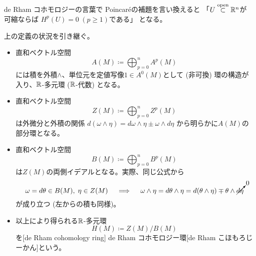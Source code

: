 \documentclass[report]{jlreq}
\begin{document}

\begin{remark}
    de Rham コホモロジーの言葉で Poincar\'{e}の補題を言い換えると
    「$U \stackrel{\text{open}}{\subset} \mathbb{R}^n$が可縮ならば
    $H^p(U) = 0 \; (p \ge 1)$である」
    となる。
\end{remark}

\begin{definition}
    上の定義の状況を引き継ぐ。
    \begin{itemize}
        \item 直和ベクトル空間
            \begin{equation}
                A(M) \coloneqq \bigoplus_{p = 0}^n A^p(M)
            \end{equation}
            には積を外積$\wedge$、単位元を定値写像$1 \in A^0(M)$として
            (非可換) 環の構造が入り、$\mathbb{R}$-多元環 ($\mathbb{R}$-代数) となる。
        \item 直和ベクトル空間
            \begin{equation}
                Z(M) \coloneqq \bigoplus_{p = 0}^n Z^p(M)
            \end{equation}
            は外微分と外積の関係
            $d(\omega \wedge \eta) = d\omega \wedge \eta \pm \omega \wedge d\eta$
            から明らかに$A(M)$の部分環となる。
        \item 直和ベクトル空間
            \begin{equation}
                B(M) \coloneqq \bigoplus_{p = 0}^n B^p(M)
            \end{equation}
            は$Z(M)$の両側イデアルとなる。実際、同じ公式から
            \begin{equation}
                \omega = d\theta \in B(M), \; \eta \in Z(M)
                \quad \implies \quad
                \omega \wedge \eta
                    = d\theta \wedge \eta
                    = d(\theta \wedge \eta) \mp \theta \wedge \cancelto{0}{d\eta}
            \end{equation}
            が成り立つ (左からの積も同様)。
        \item 以上により得られる$\mathbb{R}$-多元環
            \begin{equation}
                H(M) \coloneqq Z(M) / B(M)
            \end{equation}
            を[de Rham cohomology ring]
            {de Rham コホモロジー環}[de Rham こほもろじーかん]という。
    \end{itemize}
\end{definition}
\end{document}
